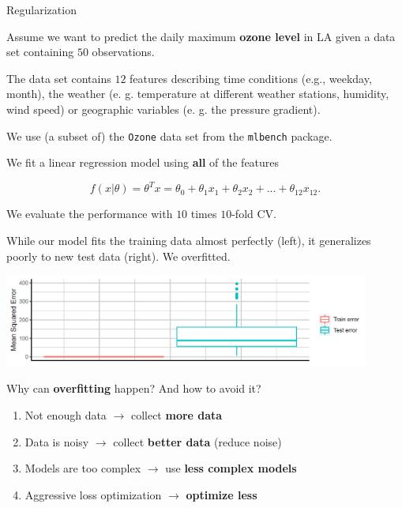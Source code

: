 \begin{vbframe}{Regularization}

Assume we want to predict the daily maximum \textbf{ozone level} in LA
given a data set containing \(50\) observations.

\vfill

The data set contains \(12\) features describing time conditions (e.g.,
weekday, month), the weather (e. g. temperature at different weather
stations, humidity, wind speed) or geographic variables (e. g. the
pressure gradient).

\vfill

We use (a subset of) the \texttt{Ozone} data set from the \texttt{mlbench} package. 

\framebreak

We fit a linear regression model using \textbf{all} of the features

\[
f(x | \theta) = \theta^Tx = \theta_0 + \theta_1 x_1 + \theta_2 x_2 + ... + \theta_{12} x_{12}.
\]

We evaluate the performance with \(10\) times \(10\)-fold CV.

\vfill

While our model fits the training data almost perfectly (left), it
generalizes poorly to new test data (right). We overfitted.

\vfill

\begin{center}
\includegraphics[width=0.9\textwidth]{plots/regularization.png}
\end{center}

\framebreak

Why can \textbf{overfitting} happen? And how to avoid it?

\begin{enumerate}
\def\labelenumi{\arabic{enumi}.}
\item
  Not enough data \(\to\) collect \textbf{more data}
\item
  Data is noisy \(\to\) collect \textbf{better data} (reduce noise)
\item
  Models are too complex \(\to\) use \textbf{less complex models}
\item
  Aggressive loss optimization \(\to\) \textbf{optimize less}
\end{enumerate}


\end{vbframe}
